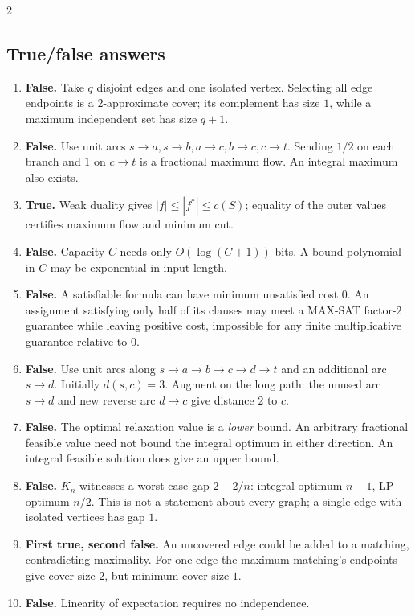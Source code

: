 \documentclass[8pt]{extarticle}
\theoremstyle{definition}
\begin{document}
\begin{multicols*}{2}
\subsection{True/false answers}
\begin{enumerate}[label=\textbf{T\arabic*.}]
  \item \textbf{False.} Take $q$ disjoint edges and one isolated vertex.
        Selecting all edge endpoints is a 2-approximate cover; its complement
        has size $1$, while a maximum independent set has size $q+1$.
  \item \textbf{False.} Use unit arcs $s\to a,s\to b,a\to c,b\to c,c\to t$.
        Sending $1/2$ on each branch and $1$ on $c\to t$ is a fractional
        maximum flow.  An integral maximum also exists.
  \item \textbf{True.} Weak duality gives $|f|\le|f^*|\le c(S)$;
        equality of the outer values certifies maximum flow and minimum cut.
  \item \textbf{False.} Capacity $C$ needs only $O(\log(C+1))$ bits.
        A bound polynomial in $C$ may be exponential in input length.
  \item \textbf{False.} A satisfiable formula can have minimum unsatisfied
        cost $0$.  An assignment satisfying only half of its clauses may
        meet a MAX-SAT factor-$2$ guarantee while leaving positive cost,
        impossible for any finite multiplicative guarantee relative to $0$.
  \item \textbf{False.} Use unit arcs along $s\to a\to b\to c\to d\to t$
        and an additional arc $s\to d$.  Initially $d(s,c)=3$.  Augment
        on the long path: the unused arc $s\to d$ and new reverse arc
        $d\to c$ give distance $2$ to $c$.
  \item \textbf{False.} The optimal relaxation value is a \emph{lower}
        bound.  An arbitrary fractional feasible value need not bound the
        integral optimum in either direction.  An integral feasible solution
        does give an upper bound.
  \item \textbf{False.} $K_n$ witnesses a worst-case gap $2-2/n$:
        integral optimum $n-1$, LP optimum $n/2$.  This is not a statement
        about every graph; a single edge with isolated vertices has gap $1$.
  \item \textbf{First true, second false.} An uncovered edge could be added
        to a matching, contradicting maximality.  For one edge the maximum
        matching's endpoints give cover size $2$, but minimum cover size $1$.
  \item \textbf{False.} Linearity of expectation requires no independence.
\end{enumerate}

\end{multicols*}
\end{document}
